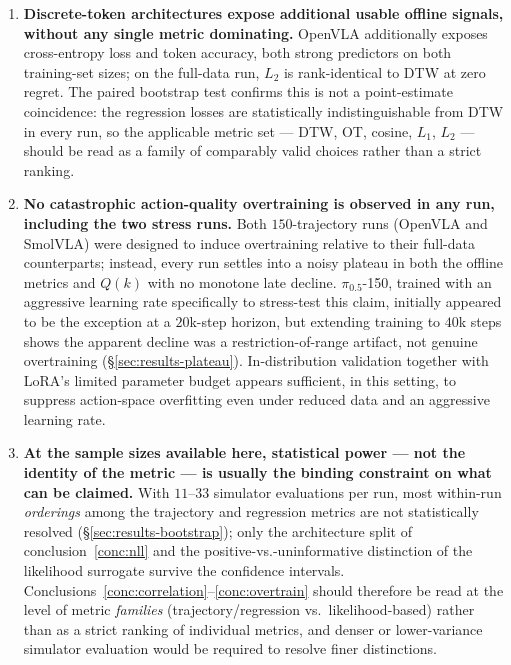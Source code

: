 \documentclass[11pt]{article}
\numberwithin{equation}{section}
\numberwithin{table}{section}
\numberwithin{figure}{section}
\begin{document}
\begin{enumerate}[label=(\alph*)]
  \item \textbf{Discrete-token architectures expose additional usable offline signals, without any
    single metric dominating.} \label{conc:signals}
    OpenVLA additionally exposes cross-entropy loss and token accuracy, both strong predictors on both
    training-set sizes; on the full-data run, $L_2$ is rank-identical to DTW at zero regret. The paired
    bootstrap test confirms this is not a point-estimate coincidence: the regression losses are
    statistically indistinguishable from DTW in every run, so the applicable metric set --- DTW, OT,
    cosine, $L_1$, $L_2$ --- should be read as a family of comparably valid choices rather than a strict
    ranking.

  \item \textbf{No catastrophic action-quality overtraining is observed in any run, including the two
    stress runs.} \label{conc:overtrain}
    Both $150$-trajectory runs (OpenVLA and SmolVLA) were designed to induce overtraining relative to
    their full-data counterparts; instead, every run settles into a noisy plateau in both the offline
    metrics and $Q(k)$ with no monotone late decline. $\pi_{0.5}$-150, trained with an aggressive
    learning rate specifically to stress-test this claim, initially appeared to be the exception at a
    $20$k-step horizon, but extending training to $40$k steps shows the apparent decline was a
    restriction-of-range artifact, not genuine overtraining (\S\ref{sec:results-plateau}). In-distribution
    validation together with LoRA's limited parameter budget appears sufficient, in this setting, to
    suppress action-space overfitting even under reduced data and an aggressive learning rate.

  \item \textbf{At the sample sizes available here, statistical power --- not the identity of the
    metric --- is usually the binding constraint on what can be claimed.} \label{conc:power}
    With $11$--$33$ simulator evaluations per run, most within-run \emph{orderings} among the
    trajectory and regression metrics are not statistically resolved (\S\ref{sec:results-bootstrap});
    only the architecture split of conclusion~\ref{conc:nll} and the positive-vs.-uninformative
    distinction of the likelihood surrogate survive the confidence intervals. Conclusions~\ref{conc:correlation}--\ref{conc:overtrain}
    should therefore be read at the level of metric \emph{families} (trajectory/regression vs.\
    likelihood-based) rather than as a strict ranking of individual metrics, and denser or lower-variance
    simulator evaluation would be required to resolve finer distinctions.
\end{enumerate}
\end{document}
